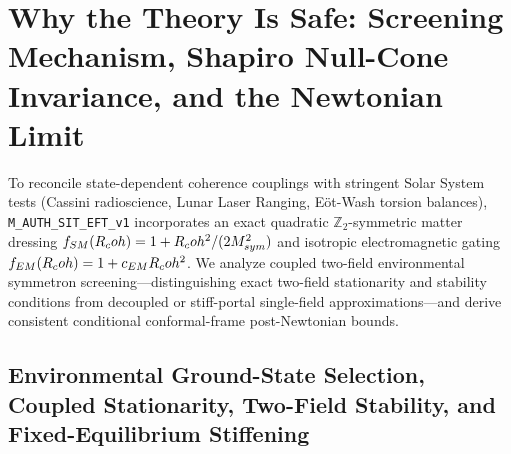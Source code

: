 \section{Why the Theory Is Safe: Screening Mechanism, Shapiro Null-Cone Invariance, and the Newtonian Limit}
\label{sec:screening-mechanism}

To reconcile state-dependent coherence couplings with stringent Solar System tests (Cassini radioscience, Lunar Laser Ranging, E\"ot-Wash torsion balances), \texttt{M\_AUTH\_SIT\_EFT\_v1} incorporates an exact quadratic $\mathbb{Z}_2$-symmetric matter dressing $f_{SM}(R_coh) = 1 + R_coh^2/(2 M_{sym}^2)$ and isotropic electromagnetic gating $f_{EM}(R_coh) = 1 + c_{EM}R_coh^2$. We analyze coupled two-field environmental symmetron screening---distinguishing exact two-field stationarity and stability conditions from decoupled or stiff-portal single-field approximations---and derive consistent conditional conformal-frame post-Newtonian bounds.

\subsection{Environmental Ground-State Selection, Coupled Stationarity, Two-Field Stability, and Fixed-Equilibrium Stiffening}

